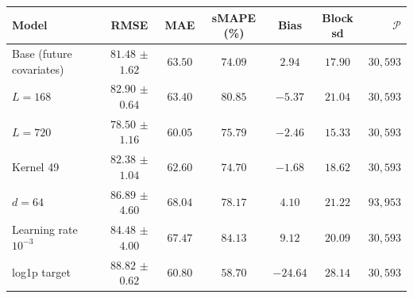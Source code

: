 \begin{tabular}{l c c c c c r}
\toprule
\textbf{Model} & RMSE & MAE & sMAPE (\%) & Bias & Block sd & $\mathcal{P}$ \\
\midrule
Base (future covariates) & $81.48$ $\pm$ $1.62$ & $63.50$ & $74.09$ & $2.94$ & $17.90$ & $30{,}593$ \\
$L = 168$ & $82.90$ $\pm$ $0.64$ & $63.40$ & $80.85$ & $-5.37$ & $21.04$ & $30{,}593$ \\
$L = 720$ & $78.50$ $\pm$ $1.16$ & $60.05$ & $75.79$ & $-2.46$ & $15.33$ & $30{,}593$ \\
Kernel 49 & $82.38$ $\pm$ $1.04$ & $62.60$ & $74.70$ & $-1.68$ & $18.62$ & $30{,}593$ \\
$d = 64$ & $86.89$ $\pm$ $4.60$ & $68.04$ & $78.17$ & $4.10$ & $21.22$ & $93{,}953$ \\
Learning rate $10^{-3}$ & $84.48$ $\pm$ $4.00$ & $67.47$ & $84.13$ & $9.12$ & $20.09$ & $30{,}593$ \\
log1p target & $88.82$ $\pm$ $0.62$ & $60.80$ & $58.70$ & $-24.64$ & $28.14$ & $30{,}593$ \\
\bottomrule
\end{tabular}
